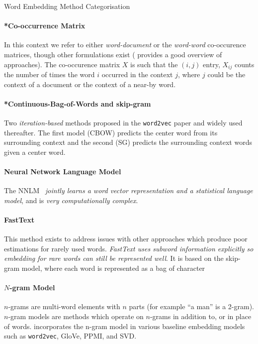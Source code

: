 \documentclass{ucetd}
\begin{document}
\begin{infobox}{Word Embedding Method Categorisation}
  \paragraph{*Co-occurrence Matrix}\label{cooccurrence-matrix-models} In this context we refer to either \emph{word-document} or the \emph{word-word} co-occurence matrices, though other formulations exist (\textcite{turney10-from-frequen-to-meanin} provides a good overview of approaches). The co-occurence matrix $X$ is such that the $(i, j)$ entry, $X_{ij}$ counts the number of times the word $i$ occurred in the context $j$, where $j$ could be the context of a document or the context of a near-by word.
  \paragraph{*Continuous-Bag-of-Words and skip-gram}\label{word2vec-models} Two \emph{iteration-based} methods proposed in the \texttt{word2vec} paper \parencite{mikolov13-effic-estim-word-repres-vector-space} and widely used thereafter. The first model (CBOW) predicts the center word from its surrounding context and the second (SG) predicts the surrounding context words given a center word.
  \paragraph{Neural Network Language Model}\label{nnl-model} The NNLM~\parencite{bengio-2003-a-neural-prob-lang-model} \emph{jointly learns a word vector representation and a statistical language model}, and is \emph{very computationally complex}.
  \paragraph{FastText}\label{fasttext} This method exists to address issues with other approaches which produce poor estimations for rarely used words. \emph{FastText uses subword information explicitly so embedding for rare words can still be represented well}. It is based on the skip-gram model, where each word is represented as a bag of character 
  \paragraph{$N$-gram Model}\label{n-gram-model} $n$-grams are multi-word elements with $n$ parts (for example ``a man'' is a 2-gram). $n$-gram models are methods which operate on $n$-grams in addition to, or in place of words. \textcite{zhao-etal-2017-ngram2vec} incorporates the n-gram model in various baseline embedding models such as \texttt{word2vec}, GloVe, PPMI, and SVD.

\end{infobox}
\end{document}
